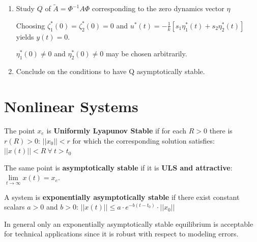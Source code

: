 \documentclass[10pt,a4paper]{scrartcl}
\begin{document}
\begin{multicols*}{3}
\begin{enumerate}[leftmargin=*]


\item Study $Q$ of $\tilde{A}=\Phi^{-1}A\Phi$ corresponding to the zero dynamics vector $\eta$

Choosing $\zeta_1^\ast(0)=\zeta_2^\ast(0)=0$ and $u^\ast(t)=-\frac{1}{k}[s_1\eta_1^\ast(t)+s_2\eta_2^\ast(t)]$ yields $y(t)=0$.

$\eta_1^\ast(0)\neq 0$ and $\eta_2^\ast(0)\neq 0$ may be chosen arbitrarily.


\item Conclude on the conditions to have Q asymptotically stable.
\end{enumerate}

\vfill
\null
\newpage

\section{Nonlinear Systems}



\finn

The point $x_e$ is \textbf{Uniformly Lyapunov Stable} if for each $R>0$ there is $r(R)>0$: $||x_0||<r$ for which the corresponding solution satisfies: $||x(t)||<R\ \forall\ t>t_0$

\finn

The same point is \textbf{asymptotically stable} if it is \textbf{ULS and attractive}: $\lim\limits_{t\rightarrow\infty} x(t) = x_e$.

\finn

A system is \textbf{exponentially asymptotically stable} if there exist constant scalars $a>0$ and $b>0$: $||x(t)||\leq a\cdot e^{-b(t-t_0)}\cdot||x_0||$

In general only an exponentially asymptotically stable equilibrium is acceptable for technical applications since it is robust with respect to modeling errors.


\end{multicols*}
\end{document}
